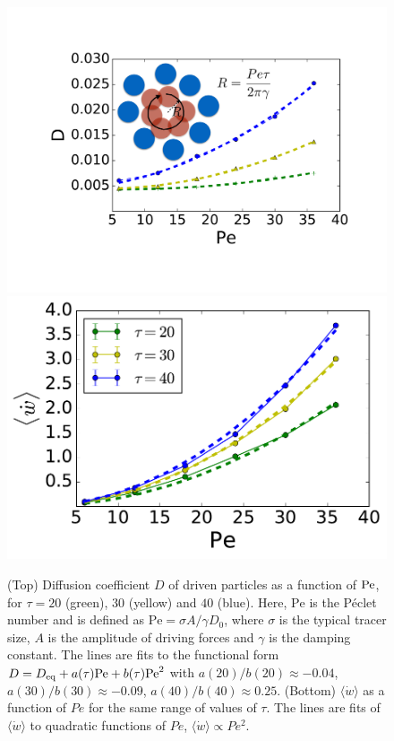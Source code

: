 \documentclass[pre, superscriptaddress, twocolumn,pre]{revtex4-1}
\begin{document}
\begin{figure}
	\centering
	\includegraphics[width=.95\linewidth]{D_active_vs_Pe_10p4.pdf}
	\includegraphics[width=.95\linewidth]{dwvsPe.pdf}
	\caption{\label{fig:diffusion}
		(Top) Diffusion coefficient $D$ of driven particles as a function of $\rm Pe$, for $\tau= 20$ (green), $30$ (yellow) and $40$ (blue). Here, $\text{Pe}$ is the P\'eclet number and is defined as $\text{Pe} = \sigma A/\gamma D_0$, where $\sigma$ is the typical tracer size, $A$ is the amplitude of driving forces and $\gamma$ is the damping constant. The lines are fits to the functional form $D = D_{\rm eq} + a(\tau) {\rm Pe} + b(\tau) {\rm Pe}^2$ with $a(20)/b(20)\approx -0.04$, $a(30)/b(30)\approx -0.09$, $a(40)/b(40)\approx 0.25$. (Bottom) $\langle \dot{w} \rangle$ as a function of $Pe$ for the same range of values of $\tau$. The lines are fits of $\langle \dot{w} \rangle$ to quadratic functions of $Pe$, $\langle \dot{w}\rangle \propto Pe^2$. 
	}
\end{figure}
\end{document}

